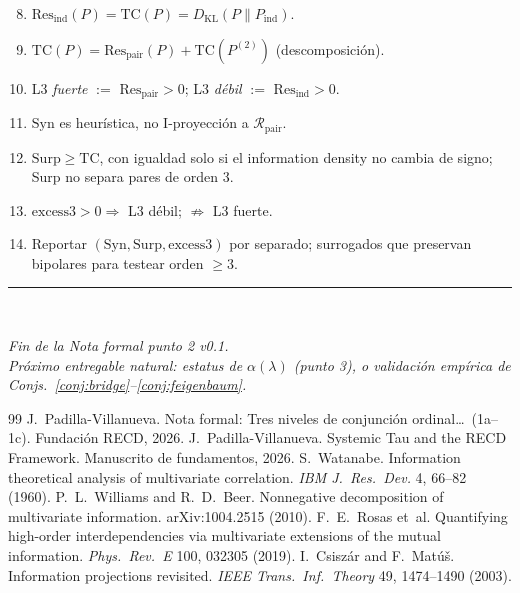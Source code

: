 \documentclass[11pt,a4paper]{article}
\theoremstyle{definition}
\theoremstyle{plain}
\theoremstyle{remark}
\newcommand{\Res}{\mathrm{Res}}
\newcommand{\TC}{\mathrm{TC}}
\newcommand{\Syn}{\mathrm{Syn}}
\newcommand{\Surp}{\mathrm{Surp}}
\newcommand{\excess}{\mathrm{excess3}}
\newcommand{\Rpair}{\mathcal{R}_{\mathrm{pair}}}
\newcommand{\KL}{D_{\mathrm{KL}}}
\begin{document}
\begin{enumerate}[label=\textbf{C\arabic*.}]
  \setcounter{enumi}{7}
  \item $\Res_{\mathrm{ind}}(P)=\TC(P)=\KL(P\|P_{\mathrm{ind}})$.
  \item $\TC(P)=\Res_{\mathrm{pair}}(P)+\TC(P^{(2)})$ (descomposici\'on).
  \item L3 \emph{fuerte} $:=$ $\Res_{\mathrm{pair}}>0$; L3 \emph{d\'ebil}
  $:=$ $\Res_{\mathrm{ind}}>0$.
  \item $\Syn$ es heur\'istica, no I-proyecci\'on a $\Rpair$.
  \item $\Surp\ge\TC$, con igualdad solo si el information density no
  cambia de signo; Surp no separa pares de orden 3.
  \item $\excess>0\Rightarrow$ L3 d\'ebil; $\not\Rightarrow$ L3 fuerte.
  \item Reportar $(\Syn,\Surp,\excess)$ por separado; surrogados que
  preservan bipolares para testear orden $\ge 3$.
\end{enumerate}

\vspace{1.5em}
\noindent\rule{\textwidth}{0.4pt}\\[0.5em]
\begin{center}
\em Fin de la Nota formal punto 2 v0.1.\\
Pr\'oximo entregable natural: estatus de $\alpha(\lambda)$ (punto 3),
o validaci\'on emp\'irica de Conjs.~\ref{conj:bridge}--\ref{conj:feigenbaum}.
\end{center}

\begin{thebibliography}{99}
J.~Padilla-Villanueva.
\newblock Nota formal: Tres niveles de conjunci\'on ordinal\ldots\ (1a--1c).
\newblock Fundaci\'on RECD, 2026.
J.~Padilla-Villanueva.
\newblock Systemic Tau and the RECD Framework.
\newblock Manuscrito de fundamentos, 2026.
S.~Watanabe.
\newblock Information theoretical analysis of multivariate correlation.
\newblock \emph{IBM J.\ Res.\ Dev.} 4, 66--82 (1960).
P.~L.~Williams and R.~D.~Beer.
\newblock Nonnegative decomposition of multivariate information.
\newblock arXiv:1004.2515 (2010).
F.~E.~Rosas et~al.
\newblock Quantifying high-order interdependencies via multivariate
extensions of the mutual information.
\newblock \emph{Phys.\ Rev.\ E} 100, 032305 (2019).
I.~Csisz\'ar and F.~Mat\'u\v{s}.
\newblock Information projections revisited.
\newblock \emph{IEEE Trans.\ Inf.\ Theory} 49, 1474--1490 (2003).
\end{thebibliography}
\end{document}
